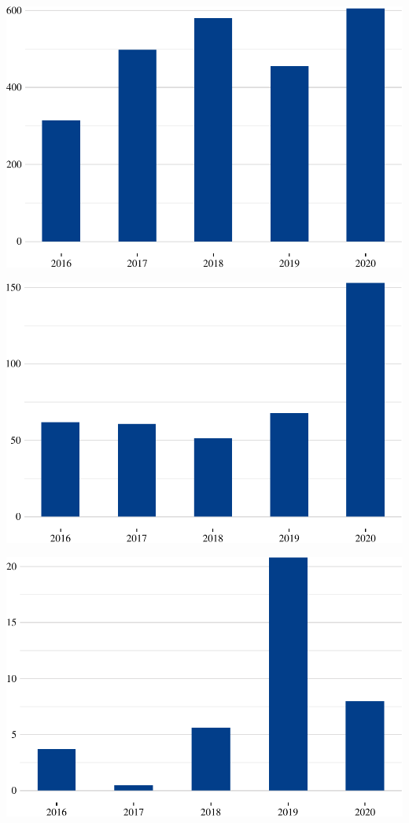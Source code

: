 \includegraphics{fig/soja1-1.pdf}

\includegraphics{fig/carne1-1.pdf}

\includegraphics{fig/farelos1-1.pdf}


